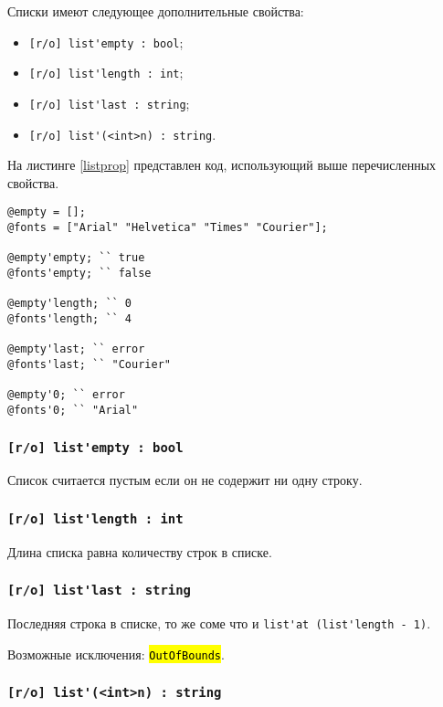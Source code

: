 \documentclass[a4paper, 14pt]{extarticle}
\newcommand{\ferror}[1]{{\fontsize{11pt}{12pt}\tt{\sethlcolor{yellow}\hl{#1}}}}
\newenvironment{icItems}
	{ \begin{itemize} [noitemsep,nolistsep] }
	{ \end{itemize} }
\begin{document}
Списки имеют следующее дополнительные свойства:
\begin{icItems}
\item
	\lstinline|[r/o] list'empty : bool|;
\item
	\lstinline|[r/o] list'length : int|;
\item
	\lstinline|[r/o] list'last : string|;
\item
	\lstinline|[r/o] list'(<int>n) : string|.
\end{icItems}

На листинге \ref{listprop} представлен код, использующий выше перечисленных свойства.

\begin{lstlisting}[caption=Свойства класса list, label=listprop]
@empty = [];
@fonts = ["Arial" "Helvetica" "Times" "Courier"];

@empty'empty; `` true
@fonts'empty; `` false

@empty'length; `` 0
@fonts'length; `` 4

@empty'last; `` error
@fonts'last; `` "Courier"

@empty'0; `` error
@fonts'0; `` "Arial"
\end{lstlisting}

\subsubsection{\lstinline|[r/o] list'empty : bool|}

Список считается пустым если он не содержит ни одну строку.

\subsubsection{\lstinline|[r/o] list'length : int|}

Длина списка равна количеству строк в списке.

\subsubsection{\lstinline|[r/o] list'last : string|}

Последняя строка в списке, то же соме что и \lstinline|list'at (list'length - 1)|.

Возможные исключения: \ferror{OutOfBounds}.

\subsubsection{\lstinline|[r/o] list'(<int>n) : string|}
\end{document}
